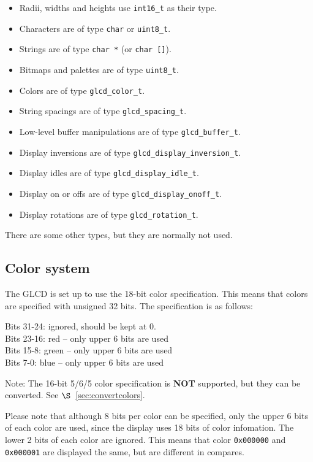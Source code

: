 \documentclass[12pt]{article}
\begin{document}
\begin{itemize}
\item Radii, widths and heights use \lstinline|int16_t| as their type.
\item Characters are of type \lstinline|char| or \lstinline|uint8_t|.
\item Strings are of type \lstinline|char *| (or \lstinline|char []|).
\item Bitmaps and palettes are of type \lstinline|uint8_t|.
\item Colors are of type \lstinline|glcd_color_t|.
\item String spacings are of type \lstinline|glcd_spacing_t|.
\item Low-level buffer manipulations are of type \lstinline|glcd_buffer_t|.
\item Display inversions are of type \lstinline|glcd_display_inversion_t|.
\item Display idles are of type \lstinline|glcd_display_idle_t|.
\item Display on or offs are of type \lstinline|glcd_display_onoff_t|.
\item Display rotations are of type \lstinline|glcd_rotation_t|.
\end{itemize}

There are some other types, but they are normally not used.

\subsection{Color system}
The GLCD is set up to use the 18-bit color specification. This means that colors are specified with unsigned 32 bits. The specification is as follows:

Bits 31-24: ignored, should be kept at 0.\\
Bits 23-16: red -- only upper 6 bits are used\\
Bits 15-8: green -- only upper 6 bits are used\\
Bits 7-0: blue -- only upper 6 bits are used

Note: The 16-bit 5/6/5 color specification is \textbf{NOT} supported, but they can be converted. See $\S$~\ref{sec:convertcolors}.

Please note that although 8 bits per color can be specified, only the upper 6 bits of each color are used, since the display uses 18 bits of color infomation. The lower 2 bits of each color are ignored. This means that color \lstinline|0x000000| and \lstinline|0x000001| are displayed the same, but are different in compares.
\end{document}
